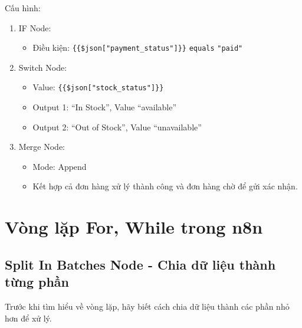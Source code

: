 
                                                           

Cấu hình:
\begin{enumerate}
  \item IF Node:
  \begin{itemize}
    \item Điều kiện: \texttt{\{\{\$json["payment\_status"]\}\}} \texttt{equals} \texttt{"paid"}
  \end{itemize}

  \item Switch Node:
  \begin{itemize}
    \item Value: \texttt{\{\{\$json["stock\_status"]\}\}}
    \item Output 1: ``In Stock'', Value ``available''
    \item Output 2: ``Out of Stock'', Value ``unavailable''
  \end{itemize}

  \item Merge Node:
  \begin{itemize}
    \item Mode: Append
    \item Kết hợp cả đơn hàng xử lý thành công và đơn hàng chờ để gửi xác nhận.
  \end{itemize}
\end{enumerate}

\section{Vòng lặp For, While trong n8n}

\subsection{Split In Batches Node - Chia dữ liệu thành từng phần}

Trước khi tìm hiểu về vòng lặp, hãy biết cách chia dữ liệu thành các phần nhỏ hơn để xử lý.

